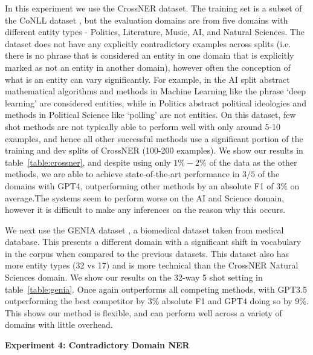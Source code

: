\documentclass[11pt]{article}
\begin{document}
In this experiment we use the CrossNER \citep{liu2021crossner} dataset. The training set is a subset of the CoNLL dataset \citep{sang2003introduction}, but the evaluation domains are from five domains with different entity types - Politics, Literature, Music, AI, and Natural Sciences. The dataset does not have any explicitly contradictory examples across splits (i.e. there is no phrase that is considered an entity in one domain that is explicitly marked as not an entity in another domain), however often the conception of what is an entity can vary significantly. For example,  in the AI split abstract mathematical algorithms and methods in Machine Learning like the phrase `deep learning' are considered entities, while in Politics abstract political ideologies and methods in Political Science like `polling' are not entities. On this dataset, few shot methods are not typically able to perform well with only around 5-10 examples, and hence all other successful methods use a significant portion of the training and dev splits of CrossNER (100-200 examples). We show our results in table~\ref{table:crossner}, and despite using only $1\%-2\%$ of the data as the other methods, we are able to achieve state-of-the-art performance in $3/5$ of the domains with GPT4, outperforming other methods by an absolute F1 of $3\%$ on average.The systems seem to perform worse on the AI and Science domain, however it is difficult to make any inferences on the reason why this occurs. 


We next use the GENIA dataset \citep{kim2003genia}, a biomedical dataset taken from medical database. This presents a different domain with a significant shift in vocabulary in the corpus when compared to the previous datasets. This dataset also has more entity types (32 vs 17) and is more technical than the CrossNER Natural Sciences domain. We show our results on the 32-way 5 shot setting in table~\ref{table:genia}. Once again \toolname outperforms all competing methods, with GPT3.5 outperforming the best competitor by 3\% absolute F1 and GPT4 doing so by 9\%. This shows our method is flexible, and can perform well across a variety of domains with little overhead. 


\noindent\textbf{Experiment 4: Contradictory Domain NER} 
\end{document}

